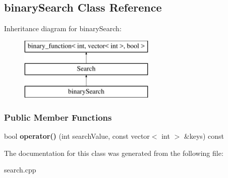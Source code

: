 \hypertarget{classbinary_search}{}\subsection{binary\+Search Class Reference}
\label{classbinary_search}
Inheritance diagram for binary\+Search\+:\begin{figure}[H]
\begin{center}
\leavevmode
\includegraphics[height=3.000000cm]{classbinary_search}
\end{center}
\end{figure}
\subsubsection*{Public Member Functions}
\begin{DoxyCompactItemize}
\item 
bool {\bfseries operator()} (int search\+Value, const vector$<$ int $>$ \&keys) const \hypertarget{classbinary_search_a8e145edfb29183d7e1b265bd4cf4293f}{}\label{classbinary_search_a8e145edfb29183d7e1b265bd4cf4293f}

\end{DoxyCompactItemize}


The documentation for this class was generated from the following file\+:\begin{DoxyCompactItemize}
\item 
search.\+cpp\end{DoxyCompactItemize}
